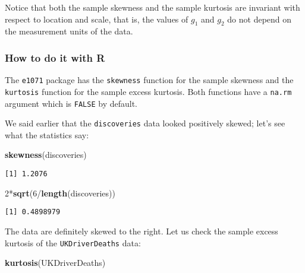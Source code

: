 \documentclass[]{book}
\newenvironment{Shaded}{\begin{snugshade}}{\end{snugshade}}
\newcommand{\KeywordTok}[1]{\textcolor[rgb]{0.13,0.29,0.53}{\textbf{{#1}}}}
\newcommand{\DecValTok}[1]{\textcolor[rgb]{0.00,0.00,0.81}{{#1}}}
\newcommand{\NormalTok}[1]{{#1}}
\numberwithin{equation}{chapter}
\numberwithin{figure}{chapter}
\theoremstyle{plain}
\theoremstyle{definition}
\theoremstyle{remark}
\theoremstyle{definition}
\theoremstyle{definition}
\theoremstyle{remark}
\let\BeginKnitrBlock\begin \let\EndKnitrBlock\end
\begin{document}
Notice that both the sample skewness and the sample kurtosis are
invariant with respect to location and scale, that is, the values of
\(g_{1}\) and \(g_{2}\) do not depend on the measurement units of the
data.

\subsubsection{How to do it with R}\label{how-to-do-it-with-r-3}

The \texttt{e1071} package \autocite{e1071} has the \texttt{skewness}
function for the sample skewness and the \texttt{kurtosis} function for
the sample excess kurtosis. Both functions have a \texttt{na.rm}
argument which is \texttt{FALSE} by default.

\bigskip

\BeginKnitrBlock{example}
\protect\hypertarget{ex:unnamed-chunk-57}{}{\label{ex:unnamed-chunk-57}}We
said earlier that the \texttt{discoveries} data looked positively
skewed; let's see what the statistics say:
\EndKnitrBlock{example}

\begin{Shaded}
\begin{Highlighting}[]
\KeywordTok{skewness}\NormalTok{(discoveries)}
\end{Highlighting}
\end{Shaded}

\begin{verbatim}
[1] 1.2076
\end{verbatim}

\begin{Shaded}
\begin{Highlighting}[]
\DecValTok{2}\NormalTok{*}\KeywordTok{sqrt}\NormalTok{(}\DecValTok{6}\NormalTok{/}\KeywordTok{length}\NormalTok{(discoveries))}
\end{Highlighting}
\end{Shaded}

\begin{verbatim}
[1] 0.4898979
\end{verbatim}

The data are definitely skewed to the right. Let us check the sample
excess kurtosis of the \texttt{UKDriverDeaths} data:

\begin{Shaded}
\begin{Highlighting}[]
\KeywordTok{kurtosis}\NormalTok{(UKDriverDeaths)}
\end{Highlighting}
\end{Shaded}
\end{document}
